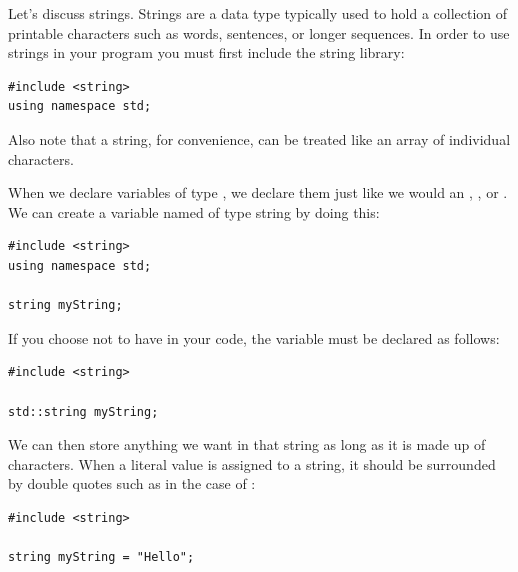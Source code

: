 
Let's discuss strings.
Strings are a data type typically used to hold a collection of printable characters such as words, sentences, or longer sequences.
In order to use strings in your program you must first include the string library:

\noindent\begin{minipage}{\linewidth}\begin{lstlisting}
#include <string>
using namespace std;
\end{lstlisting}\end{minipage}

\noindent Also note that a string, for convenience, can be treated like an array of individual characters.

When we declare variables of type , we declare them just like we would an , , or .
We can create a variable named  of type string by doing this:

\noindent\begin{minipage}{\linewidth}\begin{lstlisting}
#include <string>
using namespace std;

string myString;
\end{lstlisting}\end{minipage}

\noindent If you choose not to have  in your code, the variable  must be declared as follows:

\noindent\begin{minipage}{\linewidth}\begin{lstlisting}
#include <string>

std::string myString;
\end{lstlisting}\end{minipage}

\noindent We can then store anything we want in that string as long as it is made up of characters.
When a literal value is assigned to a string, it should be surrounded by double quotes such as in the case of :

\noindent\begin{minipage}{\linewidth}\begin{lstlisting}
#include <string>

string myString = "Hello";
\end{lstlisting}\end{minipage}

